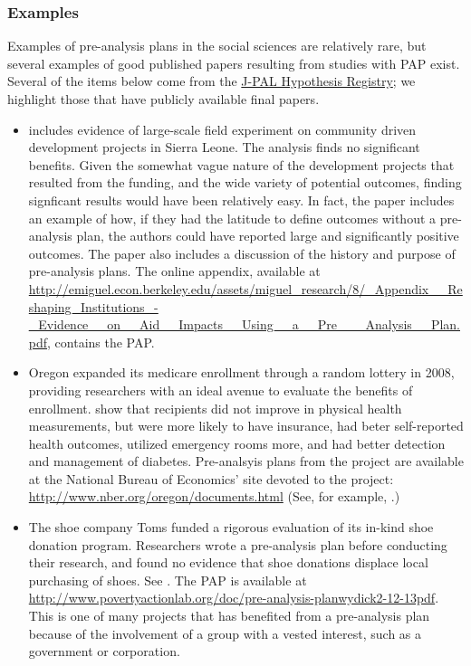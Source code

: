 \documentclass[12pt] {article}
\begin{document}
\subsubsection{Examples}\label{examples}
Examples of pre-analysis plans in the social sciences are relatively rare, but several examples of good published papers resulting from studies with PAP exist. Several of the items below come from the \href{http://www.povertyactionlab.org/Hypothesis-Registry}{J-PAL Hypothesis Registry}; we highlight those that have publicly available final papers. 


\begin{itemize}
\item 
 \cite{casey_reshaping_2012} includes evidence of large-scale field experiment on community driven development projects in Sierra Leone. The analysis finds no significant benefits. Given the somewhat vague nature of the development projects that resulted from the funding, and the wide variety of potential outcomes, finding signficant results would have been relatively easy. In fact, the paper includes an example of how, if they had the latitude to define outcomes without a pre-analysis plan, the authors could have reported large and significantly positive outcomes. The paper also includes a discussion of the history and purpose of pre-analysis plans. The online appendix, available at \url{http://emiguel.econ.berkeley.edu/assets/miguel_research/8/_Appendix__Reshaping_Institutions_-_Evidence__on__Aid__Impacts__Using__a__Pre___Analysis__Plan.pdf},
contains the PAP.


\item 
Oregon expanded its medicare enrollment through a random lottery in 2008, providing researchers with an ideal avenue to evaluate the benefits of enrollment. \cite{finkelstein_oregon_2012, Taubman17012014, doi:10.1056/NEJMsa1212321} show that recipients did not improve in physical health measurements, but were more likely to have insurance, had beter self-reported health outcomes, utilized emergency rooms more, and had better detection and management of diabetes. Pre-analsyis plans from the project are available at the National Bureau of Economics' site devoted to the project: \url{http://www.nber.org/oregon/documents.html} (See, for example, \cite{taubman_oregon_2013, baicker_katherine_oregon_2014}.)


\item
The shoe company Toms funded a rigorous evaluation of its in-kind shoe donation program. Researchers wrote a pre-analysis plan before conducting their research, and found no evidence that shoe donations displace local purchasing of shoes. See \cite{wydick_-kind_2014, katz_elizabeth_pre-analysis_2013}. The PAP is available at \url{http://www.povertyactionlab.org/doc/pre-analysis-planwydick2-12-13pdf}. This is one of many projects that has benefited from a pre-analysis plan because of the involvement of a group with a vested interest, such as a government or corporation.


\end{itemize}
\end{document}
